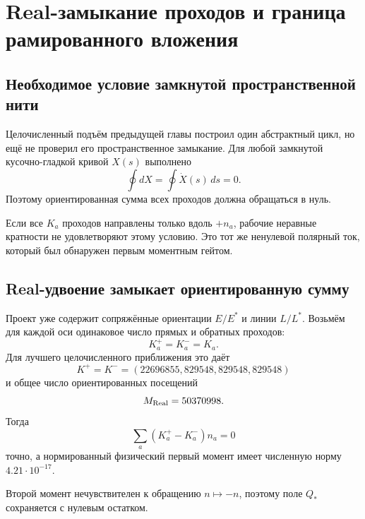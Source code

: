 \chapter{Real-замыкание проходов и граница рамированного вложения}
\label{ch:v6-single-thread-framed-winding-embedding-gate}

\section{Необходимое условие замкнутой пространственной нити}

Целочисленный подъём предыдущей главы построил один абстрактный цикл, но
ещё не проверил его пространственное замыкание. Для любой замкнутой
кусочно-гладкой кривой $X(s)$ выполнено
\begin{equation}
 \oint dX=\oint \dot X(s)\,ds=0.
 \label{eq:v6-single-thread-zero-total-tangent}
\end{equation}
Поэтому ориентированная сумма всех проходов должна обращаться в нуль.

Если все $K_a$ проходов направлены только вдоль $+n_a$, рабочие неравные
кратности не удовлетворяют этому условию. Это тот же ненулевой полярный
ток, который был обнаружен первым моментным гейтом.

\section{Real-удвоение замыкает ориентированную сумму}

Проект уже содержит сопряжённые ориентации $E/E^*$ и линии $L/L^*$.
Возьмём для каждой оси одинаковое число прямых и обратных проходов:
\begin{equation}
 K_a^+=K_a^-=K_a.
\end{equation}
Для лучшего целочисленного приближения это даёт
\begin{equation}
 K^+=K^-=(22696855,829548,829548,829548)
\end{equation}
и общее число ориентированных посещений
\begin{equation}
 M_{\rm Real}=50370998.
\end{equation}
Тогда
\begin{equation}
 \sum_a(K_a^+-K_a^-)n_a=0
\end{equation}
точно, а нормированный физический первый момент имеет численную норму
$4.21\cdot10^{-17}$.

Второй момент нечувствителен к обращению $n\mapsto-n$, поэтому поле $Q_*$
сохраняется с нулевым остатком.

